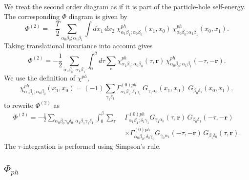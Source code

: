 We treat the second order diagram as if it is part of the
particle-hole self-energy.  The corresponding $\Phi$ diagram
is given by
\begin{equation}
\Phi^{(2)} = - \frac{T}{2} \sum_{\alpha_0 \beta_0; \alpha_1 \beta_1}
 \int dx_1\,dx_2 \; \chi^{ph}_{\alpha_1 \beta_1; \alpha_0 \beta_0}(x_1,x_0)
\, \chi^{ph}_{\alpha_0 \beta_0; \alpha_1 \beta_1}(x_0,x_1).
\end{equation}
Taking translational invariance into account gives
\begin{equation}
\Phi^{(2)} = - \frac{1}{2} \sum_{\alpha_0 \beta_0; \alpha_1 \beta_1}
\int^{\beta}_0 d\tau \sum_{\mathbf{r}} 
\chi^{ph}_{\alpha_1 \beta_1; \alpha_0 \beta_0}(\tau, \mathbf{r})\,
\chi^{ph}_{\alpha_0 \beta_0; \alpha_1 \beta_1}(-\tau, -\mathbf{r}).
\end{equation}
We use the definition of $\chi^{ph}$,
\begin{equation}
\chi^{ph}_{\alpha_1 \beta_1; \alpha_0 \beta_0}(x_1,x_0) 
 =  (-1) \sum_{\gamma_1 \delta_1}
\Gamma^{(0)ph}_{\alpha_1\beta_1; \delta_1\gamma_1}\,
G_{\gamma_1 \alpha_0}(x_1,x_0) \; G_{\beta_0 \delta_1}(x_0,x_1),
\end{equation}
to rewrite $\Phi^{(2)}$ as
\begin{equation}
\begin{split}
\Phi^{(2)} =  - \frac{1}{2} \sum_{\alpha_0 \beta_0 \gamma_0 \delta_0;
\alpha_1 \beta_1 \gamma_1 \delta_1} \int^{\beta}_0 \sum_{\mathbf{r}}\; & 
\Gamma^{(0)ph}_{\alpha_1 \beta_1; \delta_1 \gamma_1}
G_{\gamma_1 \alpha_0}(\tau, \mathbf{r}) \,
G_{\beta_0 \delta_1}(-\tau, - \mathbf{r}) \\
& \times
\Gamma^{(0)ph}_{\alpha_0 \beta_0; \delta_0 \gamma_0}
G_{\gamma_0 \alpha_1}(-\tau, -\mathbf{r}) \,
G_{\beta_1 \delta_0}(\tau, \mathbf{r}).
\end{split}
\end{equation}
The $\tau$-integration is performed using Simpson's rule.

\subsection{$\Phi_{ph}$}

